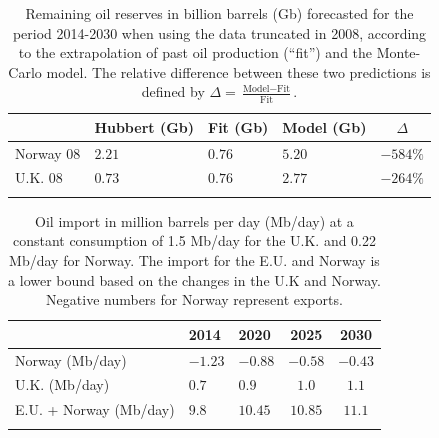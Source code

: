 \documentclass[review]{elsarticle}
\providecommand{\tabularnewline}{\\}
\begin{document}
\pagebreak


\begin{table}[H]
\caption{\doublespacing
Remaining oil reserves in billion barrels (Gb) forecasted for the period 2014-2030 when using the data truncated in 2008, according to the extrapolation of past oil production (``fit'') and the Monte-Carlo model. The relative difference between these two predictions 
is defined by $\Delta=\frac{\textrm{Model}-\textrm{Fit}}{\textrm{Fit}}$.}
\centering %
\begin{tabular}{llllc}
 & Hubbert (Gb) & Fit (Gb) & Model (Gb) & $\Delta$ \tabularnewline
\midrule Norway 08 & $2.21$ & $0.76$ & $5.20$  & $-584\%$\tabularnewline
U.K. 08 & $0.73$ & $0.76$ & $2.77$ & $-264\%$ \tabularnewline
\bottomrule  &  &  & \tabularnewline
\end{tabular}\label{forecast-08}
\end{table}

\pagebreak


\begin{table}[H]
\caption{\doublespacing
Oil import in million barrels per day (Mb/day) at a constant consumption of 1.5 Mb/day for the U.K. and 0.22 Mb/day for Norway. The import for the E.U. and Norway is a lower bound based on the changes in the U.K and Norway. Negative numbers for Norway represent exports.}
\centering %
\begin{tabular}{lllcc}
 & 2014 & 2020 & 2025 & 2030\tabularnewline
\midrule Norway (Mb/day) & $-1.23$  & $-0.88$  & $-0.58$  & $-0.43$ \tabularnewline
U.K. (Mb/day) & $0.7$  & $0.9$  & $1.0$  & $1.1$ \tabularnewline
E.U. + Norway (Mb/day) & $9.8$  & $10.45$  & $10.85$  & $11.1$ \tabularnewline
\bottomrule  &  &  &  & \tabularnewline
\end{tabular}\label{needs}
\end{table}
\end{document}
